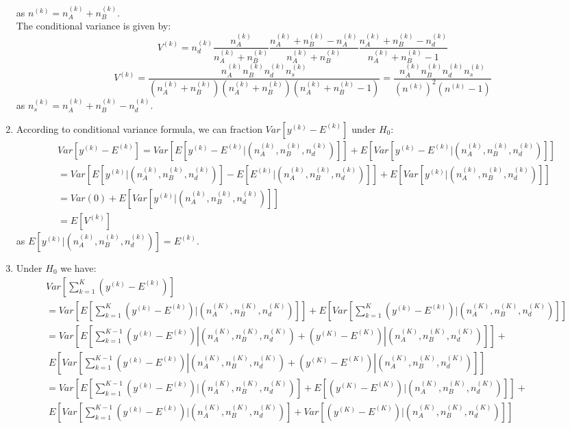 \documentclass[11pt]{article}
\begin{document}
\begin{enumerate}
as $n^{(k)} = n_A^{(k)}+n_B^{(k)}$.\\
The conditional variance is given by:\\
$$V^{(k)} = n_d^{(k)} \frac{n_A^{(k)}}{n_A^{(k)}+n_B^{(k)}} \frac{n_A^{(k)}+n_B^{(k)} - n_A^{(k)}}{n_A^{(k)}+n_B^{(k)}} \frac{n_A^{(k)}+n_B^{(k)} - n_d^{(k)}}{n_A^{(k)}+n_B^{(k)} - 1}$$
$$V^{(k)} = \frac{n_A^{(k)} n_B^{(k)} n_d^{(k)} n_s^{(k)}}{(n_A^{(k)}+n_B^{(k)})(n_A^{(k)}+n_B^{(k)})(n_A^{(k)}+n_B^{(k)}-1)} = \frac{n_A^{(k)} n_B^{(k)} n_d^{(k)} n_s^{(k)}}{(n^{(k)})^2(n^{(k)}-1)}$$
as $n_s^{(k)} = n_A^{(k)}+n_B^{(k)} - n_d^{(k)}$.
\item
According to conditional variance formula, we can fraction $Var[y^{(k)} - E^{(k)}]$ under $H_0$:
\begin{align*}
&Var[y^{(k)} - E^{(k)}] = Var[E[y^{(k)} - E^{(k)}|(n_A^{(k)},n_B^{(k)},n_d^{(k)})]]+E[Var[y^{(k)} - E^{(k)}|(n_A^{(k)},n_B^{(k)},n_d^{(k)})]]\\
& = Var[E[y^{(k)}|(n_A^{(k)},n_B^{(k)},n_d^{(k)})] - E[E^{(k)}|(n_A^{(k)},n_B^{(k)},n_d^{(k)})]] +E[Var[y^{(k)}|(n_A^{(k)},n_B^{(k)},n_d^{(k)})]]\\
& = Var(0) + E[Var[y^{(k)}|(n_A^{(k)},n_B^{(k)},n_d^{(k)})]]\\
& = E[V^{(k)}]
\end{align*}
as $E[y^{(k)}|(n_A^{(k)},n_B^{(k)},n_d^{(k)})] = E^{(k)}$.
\item
Under $H_0$ we have:\\
\begin{align*}
&Var[\sum \limits_{k=1}^K (y^{(k)} - E^{(k)})] \\
& = Var[E[\sum \limits_{k=1}^K (y^{(k)} - E^{(k)})|(n_A^{(K)},n_B^{(K)},n_d^{(K)})]]+ E[Var[\sum \limits_{k=1}^K (y^{(k)} - E^{(k)})|(n_A^{(K)},n_B^{(K)},n_d^{(K)})]]\\
& = Var[E[\sum \limits_{k=1}^{K-1} (y^{(k)} - E^{(k)})|(n_A^{(K)},n_B^{(K)},n_d^{(K)}) + (y^{(K)} - E^{(K)})|(n_A^{(K)},n_B^{(K)},n_d^{(K)})]]+\\
& \; E[Var[\sum \limits_{k=1}^{K-1} (y^{(k)} - E^{(k)})|(n_A^{(K)},n_B^{(K)},n_d^{(K)})+ (y^{(K)} - E^{(K)})|(n_A^{(K)},n_B^{(K)},n_d^{(K)})]]\\
& = Var[E[\sum \limits_{k=1}^{K-1} (y^{(k)} - E^{(k)})|(n_A^{(K)},n_B^{(K)},n_d^{(K)})] + E[(y^{(K)} - E^{(K)})|(n_A^{(K)},n_B^{(K)},n_d^{(K)})]]+\\
& \; E[Var[\sum \limits_{k=1}^{K-1} (y^{(k)} - E^{(k)})|(n_A^{(K)},n_B^{(K)},n_d^{(K)})]+ Var[(y^{(K)} - E^{(K)})|(n_A^{(K)},n_B^{(K)},n_d^{(K)})]]\\

\end{align*}
\end{enumerate}
\end{document}
